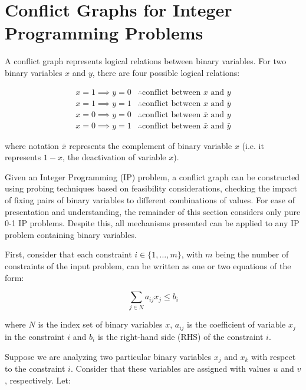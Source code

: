 \documentclass[preprint,12pt]{elsarticle}
\begin{document}
\section{Conflict Graphs for Integer Programming Problems}\label{cgraph}

A conflict graph represents logical relations between binary variables. For two binary variables $x$ and $y$, there are four possible logical relations:

\begin{align}
x = 1 \implies y = 0 & \therefore \text{conflict between } x \text{ and } y\nonumber\\
x = 1 \implies y = 1 & \therefore \text{conflict between } x \text{ and } \bar{y}\nonumber\\
x = 0 \implies y = 0 & \therefore \text{conflict between } \bar{x} \text{ and } y\nonumber\\
x = 0 \implies y = 1 & \therefore \text{conflict between } \bar{x} \text{ and } \bar{y}\nonumber
\end{align}

\noindent where notation $\bar{x}$ represents the complement of binary variable $x$ (i.e. it represents $1 - x$, the deactivation of variable $x$).

Given an Integer Programming (IP) problem, a conflict graph can be constructed using probing techniques based on feasibility considerations, checking the impact of fixing pairs of binary variables to different combinations of values. For ease of presentation and understanding, the remainder of this section considers only pure 0-1 IP problems. Despite this, all mechanisms presented can be applied to any IP problem containing binary variables.

First, consider that each constraint $i \in \{1,\ldots,m\}$, with $m$ being the number of constraints of the input problem, can be written as one or two equations of the form:

\begin{equation}\label{leqConstraints}
 \sum_{j \in N} a_{ij}x_{j} \leq b_i
\end{equation}

\noindent where $N$ is the index set of binary variables $x$, $a_{ij}$ is the coefficient of variable $x_{j}$ in the constraint $i$ and $b_i$ is the right-hand side (RHS) of the constraint $i$.

Suppose we are analyzing two particular binary variables $x_j$ and $x_k$ with respect to the constraint $i$. Consider that these variables are assigned with values $u$ and $v$, respectively. Let:
\end{document}
